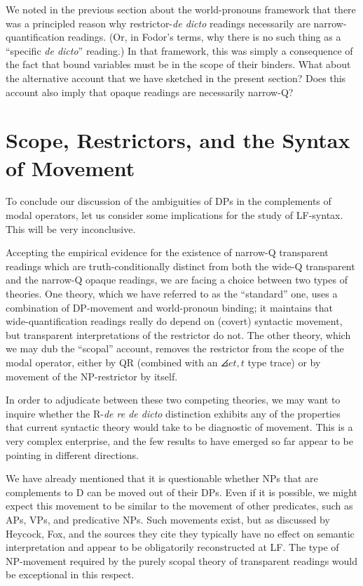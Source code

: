 \begin{exercise}
  We noted in the previous section about the world-pronouns framework that there was a principled reason why restrictor-\emph{de dicto} readings necessarily are narrow-quantification readings. (Or, in Fodor's terms, why there is no such thing as a ``specific \emph{de dicto}'' reading.) In that framework, this was simply a consequence of the fact that bound variables must be in the scope of their binders. What about the alternative account that we have sketched in the present section? Does this account also imply that opaque readings are necessarily narrow-Q? \eex 
\end{exercise}

\section{Scope, Restrictors, and the Syntax of Movement}

To conclude our discussion of the ambiguities of DPs in the complements of modal operators, let us consider some implications for the study of LF-syntax. This will be very inconclusive.

Accepting the empirical evidence for the existence of narrow-Q transparent readings which are truth-conditionally distinct from both the wide-Q transparent and the narrow-Q opaque readings, we are facing a choice between two types of theories. One theory, which we have referred to as the ``standard'' one, uses a combination of DP-movement and world-pronoun binding; it maintains that wide-quantification readings really do depend on (covert) syntactic movement, but transparent interpretations of the restrictor do not. The other theory, which we may dub the ``scopal'' account, removes the restrictor from the scope of the modal operator, either by QR (combined with an $\angles{et,t}$ type trace) or by movement of the NP-restrictor by itself.

In order to adjudicate between these two competing theories, we may want to inquire whether the R-\emph{de re \dash de dicto} distinction exhibits any of the properties that current syntactic theory would take to be diagnostic of movement. This is a very complex enterprise, and the few results to have emerged so far appear to be pointing in different directions.

We have already mentioned that it is questionable whether NPs that are complements to D can be moved out of their DPs. Even if it is possible, we might expect this movement to be similar to the movement of other predicates, such as APs, VPs, and predicative NPs. Such movements exist, but \dash as discussed by Heycock, Fox, and the sources they cite \dash they typically have no effect on semantic interpretation and appear to be obligatorily reconstructed at LF. The type of NP-movement required by the purely scopal theory of transparent readings would be exceptional in this respect.


